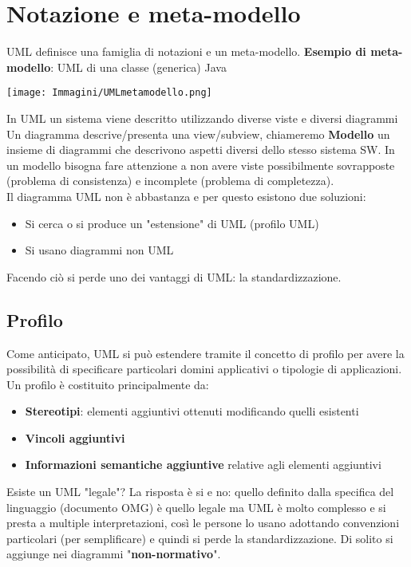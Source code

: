 \documentclass[12pt, a4paper]{report}
\begin{document}
\section{Notazione e meta-modello}
UML definisce una famiglia di notazioni e un meta-modello.
\textbf{Esempio di meta-modello}: UML di una classe (generica) Java
\begin{center}
    \texttt{[image: Immagini/UMLmetamodello.png]}
\end{center}
In UML un sistema viene descritto utilizzando diverse viste e diversi diagrammi
Un diagramma descrive/presenta una view/subview, chiameremo \textbf{Modello} un insieme di diagrammi che descrivono aspetti diversi dello stesso sistema SW. In un modello bisogna fare attenzione a non avere viste possibilmente sovrapposte (problema di consistenza) e incomplete (problema di completezza).\\
Il diagramma UML non è abbastanza e per questo esistono due soluzioni:
\begin{itemize}
    \item Si cerca o si produce un "estensione" di UML (profilo UML)
    \item Si usano diagrammi non UML
\end{itemize}
Facendo ciò si perde uno dei  vantaggi di UML: la standardizzazione.
\subsection{Profilo}
Come anticipato, UML si può estendere tramite il concetto di profilo per avere la possibilità di specificare particolari domini applicativi o tipologie di applicazioni.\\
Un profilo è costituito principalmente da:
\begin{itemize}
    \item \textbf{Stereotipi}: elementi aggiuntivi ottenuti modificando quelli esistenti
    \item \textbf{Vincoli aggiuntivi}
    \item \textbf{Informazioni semantiche aggiuntive} relative agli elementi aggiuntivi
\end{itemize}
Esiste un UML "legale"? La risposta è si e no: quello definito dalla specifica del  linguaggio (documento OMG) è quello legale ma UML è molto complesso e si presta a multiple interpretazioni, così le persone lo usano adottando convenzioni particolari (per semplificare) e quindi si perde la standardizzazione. Di solito si aggiunge nei diagrammi "\textbf{non-normativo}".
\end{document}

